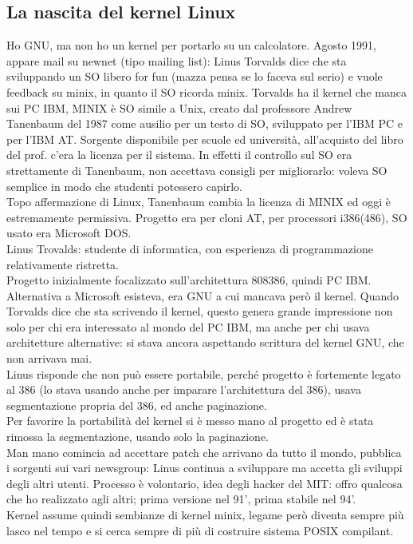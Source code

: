 \documentclass[12pt, oneside]{extbook}
\begin{document}
\subsection{La nascita del kernel Linux}
Ho GNU, ma non ho un kernel per portarlo su un calcolatore. Agosto 1991, appare mail su newnet (tipo mailing list): Linus Torvalds dice che sta sviluppando un SO libero for fun (mazza pensa se lo faceva sul serio) e vuole feedback su minix, in quanto il SO ricorda minix. Torvalds ha il kernel che manca sui PC IBM, MINIX è SO simile a Unix, creato dal professore Andrew Tanenbaum del 1987 come ausilio per un testo di SO, sviluppato per l'IBM PC e per l'IBM AT. Sorgente disponibile per scuole ed università, all'acquisto del libro del prof. c'era la licenza per il sistema. In effetti il controllo sul SO era strettamente di Tanenbaum, non accettava consigli per migliorarlo: voleva SO semplice in modo che studenti potessero capirlo.\\ Topo affermazione di Linux, Tanenbaum cambia la licenza di MINIX ed oggi è estremamente permissiva. Progetto era per cloni AT, per processori i386(486), SO usato era Microsoft DOS.\\ Linus Trovalds: studente di informatica, con esperienza di programmazione relativamente ristretta.\\ Progetto inizialmente focalizzato sull'architettura 808386, quindi PC IBM. Alternativa a Microsoft esisteva, era GNU a cui mancava però il kernel. Quando Torvalds dice che sta scrivendo il kernel, questo genera grande impressione non solo per chi era interessato al mondo del PC IBM, ma anche per chi usava architetture alternative: si stava ancora aspettando scrittura del kernel GNU, che non arrivava mai.\\ Linus risponde che non può essere portabile, perché progetto è fortemente legato al 386 (lo stava usando anche per imparare l'architettura del 386), usava segmentazione propria del 386, ed anche paginazione.\\ Per favorire la portabilità del kernel si è messo mano al progetto ed è stata rimossa la segmentazione, usando solo la paginazione.\\ Man mano comincia ad accettare patch che arrivano da tutto il mondo, pubblica i sorgenti sui vari newsgroup: Linus continua a sviluppare ma accetta gli sviluppi degli altri utenti. Processo è volontario, idea degli hacker del MIT: offro qualcosa che ho realizzato agli altri; prima versione nel 91', prima stabile nel 94'.\\ Kernel assume quindi sembianze di kernel minix, legame però diventa sempre più lasco nel tempo e si cerca sempre di più di costruire sistema POSIX compilant.
\end{document}
